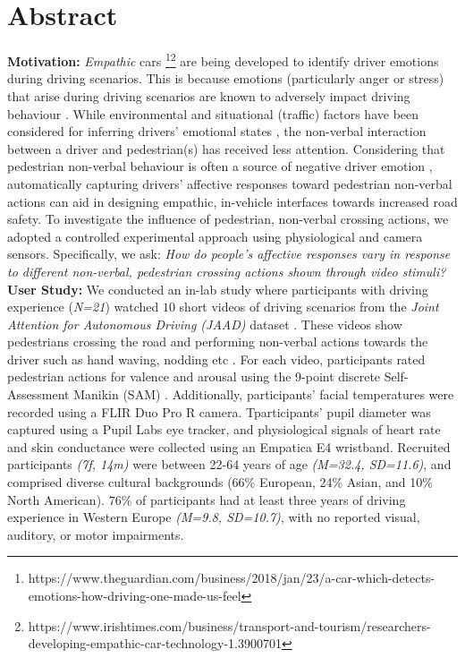 \documentclass[acmlarge]{acmart}
\begin{document}
\section*{Abstract}
\textbf{Motivation:} 
\textit{Empathic} cars \footnote{https://www.theguardian.com/business/2018/jan/23/a-car-which-detects-emotions-how-driving-one-made-us-feel}\footnote{https://www.irishtimes.com/business/transport-and-tourism/researchers-developing-empathic-car-technology-1.3900701} are being developed to identify driver emotions during driving scenarios. This is because emotions (particularly anger or stress) that arise during driving scenarios are known to adversely impact driving behaviour \cite{2015:tf:jeon}. While environmental and situational (traffic) factors have been considered for inferring drivers' emotional states \cite{2018:frontiers:habibovic, 2019:MTI:braun, jeon2016don}, the non-verbal interaction between a driver and pedestrian(s) has received less attention. Considering that pedestrian non-verbal behaviour is often a source of negative driver emotion \cite{zepf2019towards}, automatically capturing drivers' affective responses toward pedestrian non-verbal actions can aid in designing empathic, in-vehicle interfaces towards increased road safety. To investigate the influence of pedestrian, non-verbal crossing actions, we adopted a controlled experimental approach using physiological and camera sensors. Specifically, we ask: \textit{How do people's affective responses vary in response to different non-verbal, pedestrian crossing actions shown through video stimuli?}
\\


\noindent \textbf{User Study:}  
We conducted an in-lab study where participants with driving experience (\textit{N=21}) watched $10$ short videos of driving scenarios from the \textit{Joint Attention for Autonomous Driving (JAAD)} dataset \cite{2017:IV:rasouli, Ghosh2022}. These videos show pedestrians crossing the road and performing non-verbal actions towards the driver such as hand waving, nodding etc \cite{2016:arxiv:jaad}. For each video, participants rated pedestrian actions for valence and arousal using the 9-point discrete Self-Assessment Manikin (SAM) \cite{bradley1994measuring}. Additionally, participants' facial temperatures were recorded using a FLIR Duo Pro R camera. Tparticipants' pupil diameter was captured using a Pupil Labs eye tracker, and physiological signals of heart rate and skin conductance were collected using an Empatica E4 wristband. Recruited participants \textit{(7f, 14m)} were between 22-64 years of age \textit{(M=32.4, SD=11.6)}, and comprised diverse cultural backgrounds (66\% European, 24\% Asian, and 10\% North American). $76\%$ of participants had at least three years of driving experience in Western Europe \textit{(M=9.8, SD=10.7)}, with no reported visual, auditory, or motor impairments.
\\
\end{document}
